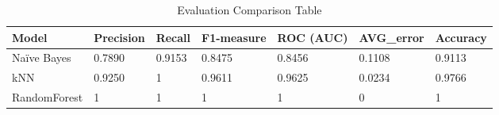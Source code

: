 \documentclass[]{article}
\begin{document}
\begin{table}[]
	\centering
	\caption{Evaluation Comparison Table}
	\label{my-label}
	\begin{tabular}{|l|l|l|l|l|l|l |}
		\hline
		\textbf{ Model }        & \textbf{ Precision } & \textbf{ Recall } & \textbf{ F1-measure } & \textbf{ ROC (AUC) } & \textbf{ AVG\_error  } & \textbf{Accuracy }\\ \hline
		Naïve Bayes  & 0.7890 &     0.9153   &    0.8475        & 0.8456    & 0.1108 & 0.9113 \\ \hline
		kNN  &      0.9250     &    1    &      0.9611 & 0.9625 & 0.0234  & 0.9766 \\ \hline
		RandomForest &  1  &  1  &  1   &  1    & 0 & 1\\ \hline
	\end{tabular}
\end{table}
\end{document}
